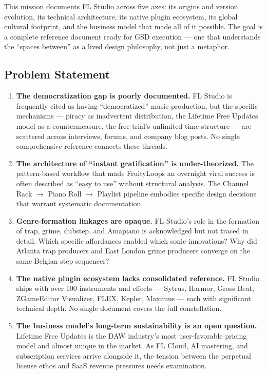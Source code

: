 \documentclass[11pt,letterpaper]{article}
\begin{document}
This mission documents FL Studio across five axes: its origins and version evolution, its technical architecture, its native plugin ecosystem, its global cultural footprint, and the business model that made all of it possible. The goal is a complete reference document ready for GSD execution --- one that understands the ``spaces between'' as a lived design philosophy, not just a metaphor.

\subsection{Problem Statement}

\begin{enumerate}
  \item \textbf{The democratization gap is poorly documented.} FL Studio is frequently cited as having ``democratized'' music production, but the specific mechanisms --- piracy as inadvertent distribution, the Lifetime Free Updates model as a countermeasure, the free trial's unlimited-time structure --- are scattered across interviews, forums, and company blog posts. No single comprehensive reference connects these threads.

  \item \textbf{The architecture of ``instant gratification'' is under-theorized.} The pattern-based workflow that made FruityLoops an overnight viral success is often described as ``easy to use'' without structural analysis. The Channel Rack $\rightarrow$ Piano Roll $\rightarrow$ Playlist pipeline embodies specific design decisions that warrant systematic documentation.

  \item \textbf{Genre-formation linkages are opaque.} FL Studio's role in the formation of trap, grime, dubstep, and Amapiano is acknowledged but not traced in detail. Which specific affordances enabled which sonic innovations? Why did Atlanta trap producers and East London grime producers converge on the same Belgian step sequencer?

  \item \textbf{The native plugin ecosystem lacks consolidated reference.} FL Studio ships with over 100 instruments and effects --- Sytrus, Harmor, Gross Beat, ZGameEditor Visualizer, FLEX, Kepler, Maximus --- each with significant technical depth. No single document covers the full constellation.

  \item \textbf{The business model's long-term sustainability is an open question.} Lifetime Free Updates is the DAW industry's most user-favorable pricing model and almost unique in the market. As FL Cloud, AI mastering, and subscription services arrive alongside it, the tension between the perpetual license ethos and SaaS revenue pressures needs examination.
\end{enumerate}
\end{document}
